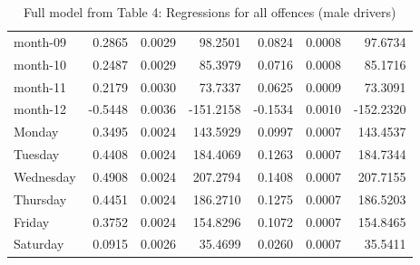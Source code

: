 \documentclass[10pt]{article}
\begin{document}
\begin{table}[ht]
\begin{tabular}{lrrrrrr}
  month-09 & 0.2865 & 0.0029 & 98.2501 & 0.0824 & 0.0008 & 97.6734 \\ 
  month-10 & 0.2487 & 0.0029 & 85.3979 & 0.0716 & 0.0008 & 85.1716 \\ 
  month-11 & 0.2179 & 0.0030 & 73.7337 & 0.0625 & 0.0009 & 73.3091 \\ 
  month-12 & -0.5448 & 0.0036 & -151.2158 & -0.1534 & 0.0010 & -152.2320 \\ 
  Monday & 0.3495 & 0.0024 & 143.5929 & 0.0997 & 0.0007 & 143.4537 \\ 
  Tuesday & 0.4408 & 0.0024 & 184.4069 & 0.1263 & 0.0007 & 184.7344 \\ 
  Wednesday & 0.4908 & 0.0024 & 207.2794 & 0.1408 & 0.0007 & 207.7155 \\ 
  Thursday & 0.4451 & 0.0024 & 186.2710 & 0.1275 & 0.0007 & 186.5203 \\ 
  Friday & 0.3752 & 0.0024 & 154.8296 & 0.1072 & 0.0007 & 154.8465 \\ 
  Saturday & 0.0915 & 0.0026 & 35.4699 & 0.0260 & 0.0007 & 35.5411 \\ 
   \hline
\end{tabular}
\caption{Full model from Table 4: Regressions for all offences (male drivers)} 
\label{tab_4_all_pts_no_age_M}
\end{table}


\clearpage
\pagebreak



\end{document}

